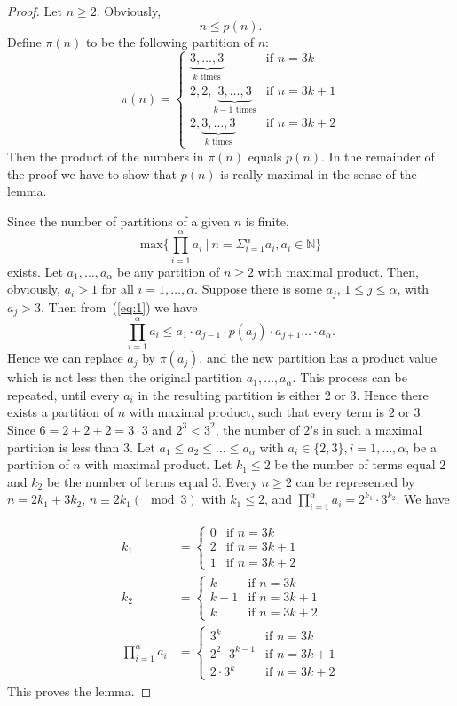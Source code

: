 \begin{proof}
Let $n\ge 2$. Obviously, \begin{equation}\label{eq:1} n\le
p(n).\end{equation} Define $\pi(n)$ to be the following partition  of $n$:
%
$$\pi(n)=\begin{cases} \underbrace{3,\ldots,3}_{k\text{ times}}  &\text{if}\,\, n=3k\\ 2,2,\underbrace{3,\ldots,3}_{k-1\text{ times}}  &\text{if}\,\, n=3k+1\\2,\underbrace{3,\ldots,3}_{k\text{ times}}  &\text{if}\,\, n=3k+2\end{cases}$$
%
Then the product of the numbers in $\pi(n)$ equals  $p(n)$. In the remainder
of the proof we have to show that $p(n)$ is really maximal in the sense of
the lemma.

Since the number of partitions of a given $n$ is finite,
%
$$\text{max}\{\prod_{i=1}^{\alpha}a_i~|~n=\Sigma_{i=1}^{\alpha}a_i, a_i\in \mathbb{N}\}$$
%
exists. Let $a_1, \ldots , a_{\alpha}$ be any partition of $n\ge 2$ with
maximal product. Then, obviously,  $a_i>1$ for all $i=1,\dots,\alpha$.
Suppose there is some $a_j$, $1\le j\le \alpha$, with $a_j>3$. Then
from~(\ref{eq:1}) we have
$$\prod_{i=1}^{\alpha}a_i\le a_1\cdot a_{j-1}\cdot p(a_j)\cdot a_{j+1}\ldots\cdot a_{\alpha}.$$
Hence we can replace $a_j$ by $\pi(a_j)$, and the new partition has  a product value
which is not less then the original partition $a_1, \ldots , a_{\alpha}$. This process
can be repeated, until every $a_i$ in the resulting partition is either 2 or 3.
Hence there exists a partition of $n$ with maximal product, such that every term is $2$ or $3$.
Since $6=2+2+2=3\cdot 3$ and $2^3< 3^2$, the number of $2$'s in such a maximal partition is less than $3$.
Let $a_1\le a_2\le \ldots\le  a_{\alpha}$ with $a_i\in \{2,3\}, i=1,\dots,\alpha$, be a partition of $n$ with maximal product. Let $k_1\le 2$ be the number of terms equal $2$ and $k_2$ be the number of terms equal $3$.
Every $n\ge 2$ can be represented by $n=2k_1+3k_2$, $n\equiv 2k_1 (\mod 3)$ with $k_1\le 2$, and $\prod_{i=1}^{\alpha}a_i=2^{k_1}\cdot 3^{k_2}$. We have

\begin{align*}k_1&=\begin{cases} 0 &\text{if}\,\, n=3k\\ 2 &\text{if}\,\, n=3k+1\\1 &\text{if}\,\, n=3k+2\end{cases}\\
 k_2&=\begin{cases} k &\text{if}\,\, n=3k\\ k-1 &\text{if}\,\, n=3k+1\\k &\text{if}\,\, n=3k+2\end{cases}\\
\prod_{i=1}^{\alpha}a_i&=\begin{cases} 3^k &\text{if}\,\, n=3k\\ 2^2\cdot 3^{k-1} &\text{if}\,\, n=3k+1\\2\cdot 3^{k} &\text{if}\,\, n=3k+2\end{cases}\end{align*}
This proves the lemma.
\xbox
\end{proof}
